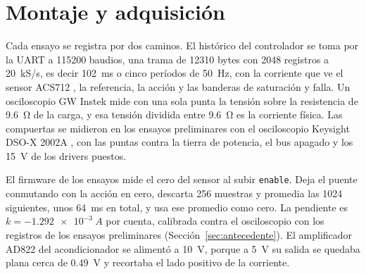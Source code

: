 \documentclass[journal]{IEEEtran}
\begin{document}
\section{Montaje y adquisición}
\label{sec:montaje}
Cada ensayo se registra por dos caminos. El histórico del controlador se toma por la UART a \num{115200} baudios, una trama de \num{12310} bytes con \num{2048} registros a \SI{20}{kS/s}, es decir \SI{102}{ms} o cinco períodos de \SI{50}{Hz}, con la corriente que ve el sensor ACS712 \cite{acs712}, la referencia, la acción y las banderas de saturación y falla. Un osciloscopio GW Instek mide con una sola punta la tensión sobre la resistencia de \SI{9.6}{\ohm} de la carga, y esa tensión dividida entre \SI{9.6}{\ohm} es la corriente física. Las compuertas se midieron en los ensayos preliminares con el osciloscopio Keysight DSO-X 2002A \cite{dsox2000}, con las puntas contra la tierra de potencia, el bus apagado y los \SI{15}{V} de los drivers puestos.

El firmware de los ensayos mide el cero del sensor al subir \texttt{enable}. Deja el puente conmutando con la acción en cero, descarta \num{256} muestras y promedia las \num{1024} siguientes, unos \SI{64}{ms} en total, y usa ese promedio como cero. La pendiente es $k=-\SI{1.292e-3}{A}$ por cuenta, calibrada contra el osciloscopio con los registros de los ensayos preliminares (Sección~\ref{sec:antecedente}). El amplificador AD822 del acondicionador se alimentó a \SI{10}{V}, porque a \SI{5}{V} su salida se quedaba plana cerca de \SI{0.49}{V} y recortaba el lado positivo de la corriente.
\end{document}
